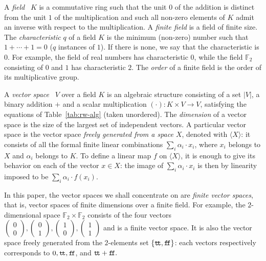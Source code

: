 \documentclass[10pt]{article}
\theoremstyle{plain}
\theoremstyle{definition}
\newcommand{\ttrue}{{\tt t}\!{\tt t}}
\newcommand{\ffalse}{{\tt f}\!{\tt f}}
\begin{document}
A {\em field}~\cite{lidl1997finite} $K$ is a commutative ring such that the unit
$0$ of the addition is distinct from the unit $1$ of the
multiplication and such all non-zero elements of $K$ admit an inverse
with respect to the multiplication. A {\em finite field} is a field of
finite size. The {\em characteristic} $q$ of a field $K$ is the
minimum (non-zero) number such that $1 + \cdots + 1 = 0$ ($q$
instances of $1$). If there is none, we say that the
characteristic is $0$. For example, the field of real numbers has
characteristic $0$, while the field $\mathbb{F}_2$ consisting of $0$
and $1$ has characteristic $2$. The {\em order} of a finite field
is the order of its multiplicative group.

A {\em vector space}~\cite{lang} $V$ over a field $K$ is an algebraic structure
consisting of a set $|V|$, a binary addition $+$ and
a scalar multiplication $(\cdot) : K\times V\to V$, satisfying the
equations of Table~\ref{tab:rw-alg} (taken unordered).
The {\em dimension} of a vector
space is the size of the largest set of independent vectors.  A
particular vector space is the vector space {\em freely generated from
  a space $X$}, denoted with $\langle X\rangle$: it consists of all
the formal finite linear combinations $\sum_i\alpha_i\cdot x_i$, where
$x_i$ belongs to $X$ and $\alpha_i$ belongs to $K$. To define a linear
map $f$ on $\langle X\rangle$, it is enough to give its behavior on each
of the vector $x\in X$: the image of $\sum_i\alpha_i\cdot x_i$ is
then by linearity imposed to be $\sum_i\alpha_i\cdot f(x_i)$.

In this paper, the vector spaces we shall concentrate on are {\em
  finite vector spaces}, that is, vector spaces of finite dimensions
over a finite field. For example, the $2$-dimensional space
$\mathbb{F}_2\times\mathbb{F}_2$ consists of the four vectors
$\left(\begin{smallmatrix}
    0\\0
  \end{smallmatrix}\right),
  \left(\begin{smallmatrix}
    0\\1
  \end{smallmatrix}\right),
  \left(\begin{smallmatrix}
    1\\0
  \end{smallmatrix}\right),
  \left(\begin{smallmatrix}
    1\\1
  \end{smallmatrix}\right)
$
and is a finite vector space. It is also the vector space freely
generated from the $2$-elements set $\{\ttrue,\ffalse\}$:
each vectors respectively corresponds to
$
0,\ttrue, \ffalse$, and $\ttrue + \ffalse.
$
\end{document}
